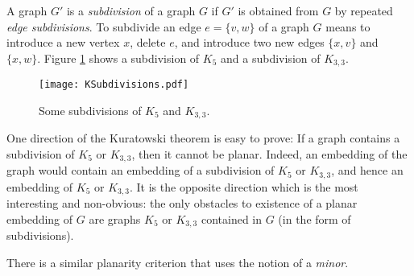 
A graph $G'$ is a \emph{subdivision} of a graph $G$ if $G'$ is obtained from $G$ by repeated \emph{edge subdivisions}.
To subdivide an edge $e = \{v,w\}$ of a graph $G$ means to introduce a new vertex $x$, delete $e$, and introduce two new edges $\{x,v\}$ and $\{x,w\}$.
Figure \ref{fig:KSubdivisions} shows a subdivision of $K_5$ and a subdivision of $K_{3,3}$.

\begin{figure}[ht]
\begin{center}
\texttt{[image: KSubdivisions.pdf]}
\end{center}
\caption{Some subdivisions of $K_5$ and $K_{3,3}$.}
\label{fig:KSubdivisions}
\end{figure}

One direction of the Kuratowski theorem is easy to prove: If a graph contains a subdivision of $K_5$ or $K_{3,3}$, then it cannot be planar.
Indeed, an embedding of the graph would contain an embedding of a subdivision of $K_5$ or $K_{3,3}$,
and hence an embedding of $K_5$ or $K_{3,3}$.
It is the opposite direction which is the most interesting and non-obvious:
the only obstacles to existence of a planar embedding of $G$ are graphs $K_5$ or $K_{3,3}$ contained in $G$ (in the form of subdivisions).


There is a similar planarity criterion that uses the notion of a \emph{minor}.
